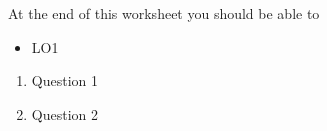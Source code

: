 \documentclass[letterpaper,12pt]{article}
\begin{document}
At the end of this worksheet you should be able to  
\begin{itemize}
	\item LO1
\end{itemize}


\begin{enumerate}
\setlength\itemsep{1 in}

\item
Question 1
\item
Question 2



\newpage 

\ %

\newpage

\end{enumerate}
\end{document}

